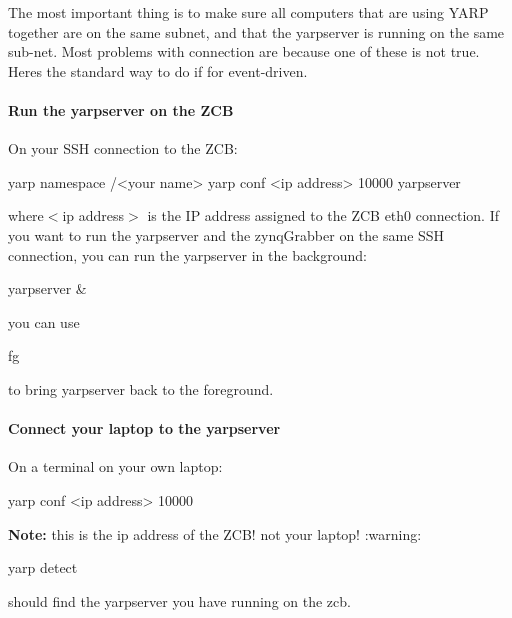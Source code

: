 The most important thing is to make sure all computers that are using {\ttfamily Y\+A\+RP} together are on the same subnet, and that the {\ttfamily yarpserver} is running on the same sub-\/net. Most problems with connection are because one of these is not true. Here\textquotesingle{}s the standard way to do if for {\ttfamily event-\/driven}.

\paragraph*{Run the {\ttfamily yarpserver} on the Z\+CB}

On your S\+SH connection to the Z\+CB\+: 
\begin{DoxyCode}
yarp namespace /<your name>
yarp conf <ip address> 10000
yarpserver
\end{DoxyCode}
 where{\ttfamily $<$ip address$>$} is the IP address assigned to the Z\+CB eth0 connection. If you want to run the {\ttfamily yarpserver} and the {\ttfamily zynq\+Grabber} on the same S\+SH connection, you can run the {\ttfamily yarpserver} in the background\+: 
\begin{DoxyCode}
yarpserver &
\end{DoxyCode}
 you can use 
\begin{DoxyCode}
fg
\end{DoxyCode}
 to bring {\ttfamily yarpserver} back to the foreground.

\paragraph*{Connect your laptop to the {\ttfamily yarpserver}}

On a terminal on your own laptop\+: 
\begin{DoxyCode}
yarp conf <ip address> 10000
\end{DoxyCode}
 {\bfseries Note\+:} this is the ip address of the Z\+C\+B! not your laptop! \+:warning\+: 
\begin{DoxyCode}
yarp detect
\end{DoxyCode}
 should find the {\ttfamily yarpserver} you have running on the zcb. 